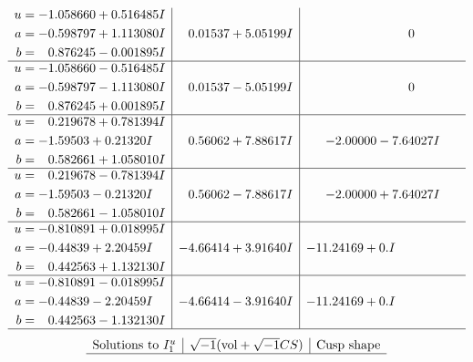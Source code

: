 \documentclass[1p]{elsarticle_modified}
\theoremstyle{definition}
\newcommand{\I}{\sqrt{-1}}
\begin{document}
$$\begin{array}{c|c|c}
\begin{aligned}
u &= -1.058660 + 0.516485 I \\
a &= -0.598797 + 1.113080 I \\
b &= \phantom{-}0.876245 - 0.001895 I\end{aligned}
 & \phantom{-}0.01537 + 5.05199 I & \phantom{-0.000000 } 0 \\ \hline\begin{aligned}
u &= -1.058660 - 0.516485 I \\
a &= -0.598797 - 1.113080 I \\
b &= \phantom{-}0.876245 + 0.001895 I\end{aligned}
 & \phantom{-}0.01537 - 5.05199 I & \phantom{-0.000000 } 0 \\ \hline\begin{aligned}
u &= \phantom{-}0.219678 + 0.781394 I \\
a &= -1.59503 + 0.21320 I \\
b &= \phantom{-}0.582661 + 1.058010 I\end{aligned}
 & \phantom{-}0.56062 + 7.88617 I & -2.00000 - 7.64027 I \\ \hline\begin{aligned}
u &= \phantom{-}0.219678 - 0.781394 I \\
a &= -1.59503 - 0.21320 I \\
b &= \phantom{-}0.582661 - 1.058010 I\end{aligned}
 & \phantom{-}0.56062 - 7.88617 I & -2.00000 + 7.64027 I \\ \hline\begin{aligned}
u &= -0.810891 + 0.018995 I \\
a &= -0.44839 + 2.20459 I \\
b &= \phantom{-}0.442563 + 1.132130 I\end{aligned}
 & -4.66414 + 3.91640 I & -11.24169 + 0. I\phantom{ +0.000000I} \\ \hline\begin{aligned}
u &= -0.810891 - 0.018995 I \\
a &= -0.44839 - 2.20459 I \\
b &= \phantom{-}0.442563 - 1.132130 I\end{aligned}
 & -4.66414 - 3.91640 I & -11.24169 + 0. I\phantom{ +0.000000I}\\
 \hline 
 \end{array}$$\newpage$$\begin{array}{c|c|c}  
\text{Solutions to }I^u_{1}& \I (\text{vol} + \sqrt{-1}CS) & \text{Cusp shape}\\
 \hline 

\end{array}$$
\end{document}
